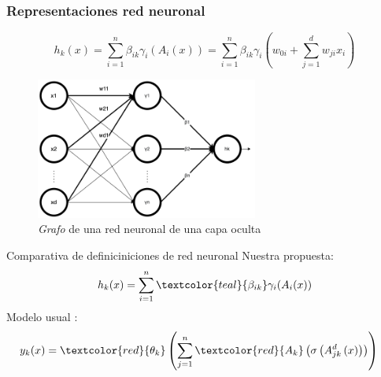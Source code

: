 \documentclass{beamer}
\begin{document}
\begin{frame}
    \frametitle{Representaciones red neuronal}
    \begin{equation*}
        h_k(x) =  \sum_{i=1}^{n} \beta_{i k} \gamma_{i}( A_{i}(x))
        = 
        \sum_{i=1}^{n} \beta_{i k} \gamma_{i}
        \left(
            w_{0 i} + \sum_{j=1}^d w_{j i } x_i
        \right) 
    \end{equation*}
    \begin{figure}[h!]
        \centering
        \includegraphics[width=0.65\textwidth]{1-Introduccion_redes_neuronales/Red-Neuronal-una-capa-simple.png}
        \caption{\textit{Grafo} de una red neuronal de una capa oculta}
        \label{img:grafo-red-neuronal-una-capa-oculta_repeticion}
    \end{figure}

\end{frame}

\begin{frame}{Comparativa de definiciniciones de red neuronal}
    Nuestra propuesta: 
    \begin{align*}
                h_k(x) = 
                \sum_{i=1}^{n} \textcolor{teal}{\beta_{i k}} \gamma_{i}( A_{i}(x))
    \end{align*}
    Modelo usual \cite{MostafaLearningFromData}:
    \begin{align*}
        y_k(x) &= 
        \textcolor{red}{\theta_k}
        \left( 
            \sum^n_{j=1} \textcolor{red}{A_{k}}
            \left(
                \sigma 
                \left(
                    A^{d}_{j k}
                    \left(
                        x
                    \right)
                \right)
            \right)
        \right)
    \end{align*}
\end{frame}
\end{document}

